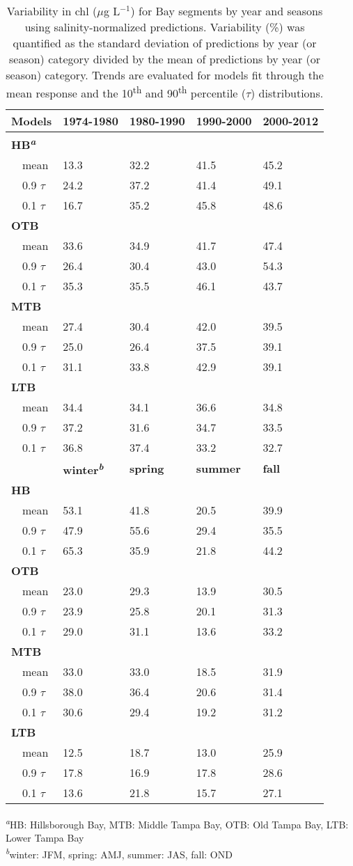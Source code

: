 \documentclass{svjour3}\usepackage[]{graphicx}\usepackage[]{color}
\newcommand{\mugl}{$\mu$g L$^{-1}$}
\begin{document}
%
\begin{table}[!tbp]
\caption{Variability in \ac{chl} (\mugl) for Bay segments by year and seasons using salinity-normalized predictions.  Variability (\%) was quantified as the standard deviation of predictions by year (or season) category divided by the mean of predictions by year (or season) category.  Trends are evaluated for models fit through the mean response and the 10\textsuperscript{th} and 90\textsuperscript{th} percentile ($\tau$) distributions.\label{tab:nrmcv}} 
\begin{center}
\begin{tabular}{lllll}
\hline\hline
\multicolumn{1}{l}{{\bf Models}}&\multicolumn{1}{c}{{\bf 1974-1980}}&\multicolumn{1}{c}{{\bf 1980-1990}}&\multicolumn{1}{c}{{\bf 1990-2000}}&\multicolumn{1}{c}{{\bf 2000-2012}}\tabularnewline
\hline
{\bfseries HB\textsuperscript{\textit{a}}}&&&&\tabularnewline
~~mean&13.3&32.2&41.5&45.2\tabularnewline
~~0.9 $\tau$&24.2&37.2&41.4&49.1\tabularnewline
~~0.1 $\tau$&16.7&35.2&45.8&48.6\tabularnewline
\hline
{\bfseries OTB}&&&&\tabularnewline
~~mean&33.6&34.9&41.7&47.4\tabularnewline
~~0.9 $\tau$&26.4&30.4&43.0&54.3\tabularnewline
~~0.1 $\tau$&35.3&35.5&46.1&43.7\tabularnewline
\hline
{\bfseries MTB}&&&&\tabularnewline
~~mean&27.4&30.4&42.0&39.5\tabularnewline
~~0.9 $\tau$&25.0&26.4&37.5&39.1\tabularnewline
~~0.1 $\tau$&31.1&33.8&42.9&39.1\tabularnewline
\hline
{\bfseries LTB}&&&&\tabularnewline
~~mean&34.4&34.1&36.6&34.8\tabularnewline
~~0.9 $\tau$&37.2&31.6&34.7&33.5\tabularnewline
~~0.1 $\tau$&36.8&37.4&33.2&32.7\tabularnewline
\hline
~~&{\bf winter\textsuperscript{\textit{b}}}&{\bf spring}&{\bf summer}&{\bf fall}\tabularnewline
\hline
{\bfseries HB}&&&&\tabularnewline
~~mean&53.1&41.8&20.5&39.9\tabularnewline
~~0.9 $\tau$&47.9&55.6&29.4&35.5\tabularnewline
~~0.1 $\tau$&65.3&35.9&21.8&44.2\tabularnewline
\hline
{\bfseries OTB}&&&&\tabularnewline
~~mean&23.0&29.3&13.9&30.5\tabularnewline
~~0.9 $\tau$&23.9&25.8&20.1&31.3\tabularnewline
~~0.1 $\tau$&29.0&31.1&13.6&33.2\tabularnewline
\hline
{\bfseries MTB}&&&&\tabularnewline
~~mean&33.0&33.0&18.5&31.9\tabularnewline
~~0.9 $\tau$&38.0&36.4&20.6&31.4\tabularnewline
~~0.1 $\tau$&30.6&29.4&19.2&31.2\tabularnewline
\hline
{\bfseries LTB}&&&&\tabularnewline
~~mean&12.5&18.7&13.0&25.9\tabularnewline
~~0.9 $\tau$&17.8&16.9&17.8&28.6\tabularnewline
~~0.1 $\tau$&13.6&21.8&15.7&27.1\tabularnewline
\hline
\end{tabular}
\end{center}
\footnotesize \textsuperscript{\textit{a}}HB: Hillsborough Bay, MTB: Middle Tampa Bay, OTB: Old Tampa Bay, LTB: Lower Tampa Bay\\\textsuperscript{\textit{b}}winter: JFM, spring: AMJ, summer: JAS, fall: OND\end{table}
\end{document}
